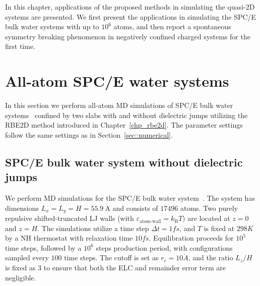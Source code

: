 In this chapter, applications of the proposed methods in simulating the quasi-2D systems are presented.
We first present the applications in simulating the SPC/E bulk water systems with up to $10^6$ atoms, and then report a spontaneous symmetry breaking phenomenon in negatively confined charged systems for the first time.

\section{All-atom SPC/E water systems}

In this section we perform all-atom MD simulations of SPC/E bulk water systems~\cite{berendsen1987missing} confined by two slabs with and without dielectric jumps utilizing the RBE2D method introduced in Chapter~\ref{chp_rbe2d}.
The parameter settings follow the same settings as in Section~\ref{sec::numerical}.

\subsection{SPC/E bulk water system without dielectric jumps}
\label{sec::waterhomo}

We perform MD simulations for the SPC/E bulk water system~\cite{berendsen1987missing}. 
The system has dimensions $L_x=L_y=H=55.9~\mathring{\text{A}}$ and consists of $17496$ atoms. 
Two purely repulsive shifted-truncated LJ walls (with $\varepsilon_{\text{atom-wall}}= k_{\text{B}}T)$ are located at $z=0$ and $z=H$.  
The simulations utilize a time step $\Delta t=1fs$, and $T$ is fixed at $298K$ by a NH thermostat with relaxation time $10fs$. 
Equilibration proceeds for $10^5$ time steps, followed by a $10^6$ steps production period, with configurations sampled every $100$ time steps. 
The cutoff is set as $r_c=10\mathring{A}$, and the ratio $L_z/H$ is fixed as $3$ to ensure that both the ELC and remainder error term are negligible.

